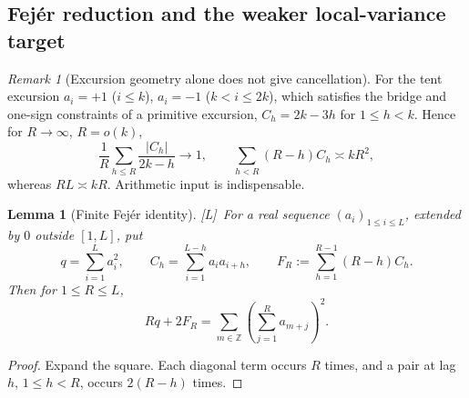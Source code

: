 \documentclass[11pt,reqno]{amsart}
\numberwithin{equation}{section}
\theoremstyle{plain}
\newtheorem{lemma}[theorem]{Lemma}
\theoremstyle{definition}
\theoremstyle{remark}
\newtheorem{remark}[theorem]{Remark}
\newcommand{\tagL}{\textup{[L]}}
\begin{document}
\subsection{Fej\'er reduction and the weaker local-variance target}

\begin{remark}[Excursion geometry alone does not give cancellation]
\label{rem:tent-chowla}
For the tent excursion $a_i=+1$ ($i\le k$), $a_i=-1$ ($k<i\le2k$), which
satisfies the bridge and one-sign constraints of a primitive excursion,
$C_h=2k-3h$ for $1\le h<k$. Hence for $R\to\infty$, $R=o(k)$,
\begin{equation}
\frac1R\sum_{h\le R}\frac{|C_h|}{2k-h}\longrightarrow1,
\qquad
\sum_{h<R}(R-h)C_h\asymp kR^2,
\end{equation}
whereas $RL\asymp kR$. Arithmetic input is indispensable.
\end{remark}

\begin{lemma}[Finite Fej\'er identity]
\label{lem:fejer}
\tagL\ For a real sequence $(a_i)_{1\le i\le L}$, extended by $0$ outside
$[1,L]$, put
\begin{equation}
q=\sum_{i=1}^La_i^2,
\qquad
C_h=\sum_{i=1}^{L-h}a_ia_{i+h},
\qquad
F_R:=\sum_{h=1}^{R-1}(R-h)C_h.
\end{equation}
Then for $1\le R\le L$,
\begin{equation}
\label{eq:fejer}
Rq+2F_R
=\sum_{m\in\mathbb Z}\left(\sum_{j=1}^{R}a_{m+j}\right)^2.
\end{equation}
\end{lemma}

\begin{proof}
Expand the square. Each diagonal term occurs $R$ times, and a pair at lag
$h$, $1\le h<R$, occurs $2(R-h)$ times.
\end{proof}
\end{document}
